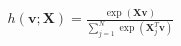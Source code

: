 \documentclass[preview]{standalone}
\begin{document}
\begin{align*}
h(\mathbf{v};\mathbf{X}) = \frac{\exp(\mathbf{X}\mathbf{v})}{\sum_{j=1}^{N}\exp(\mathbf{X}_{j}^{T}\mathbf{v})}
\end{align*}
\end{document}
